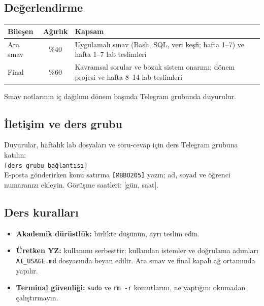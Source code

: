 \documentclass[11pt,a4paper]{article}
\begin{document}
\subsection{Değerlendirme}
\begin{center}
\begin{tabularx}{0.92\textwidth}{@{}l c Y@{}}
\toprule
\textbf{Bileşen} & \textbf{Ağırlık} & \textbf{Kapsam} \\
\midrule
Ara sınav & \%40 & Uygulamalı sınav (Bash, SQL, veri keşfi; hafta 1–7) ve hafta 1–7 lab teslimleri \\
Final & \%60 & Kavramsal sorular ve bozuk sistem onarımı; dönem projesi ve hafta 8–14 lab teslimleri \\
\bottomrule
\end{tabularx}
\end{center}
Sınav notlarının iç dağılımı dönem başında Telegram grubunda duyurulur.

\subsection{İletişim ve ders grubu}
\begin{minipage}[c]{0.62\textwidth}
Duyurular, haftalık lab dosyaları ve soru-cevap için ders Telegram grubuna katılın:\\[2mm]
\texttt{[ders grubu bağlantısı]}\\[2mm]
E-posta gönderirken konu satırına \texttt{[MBBO205]} yazın; ad, soyad ve öğrenci numaranızı ekleyin. Görüşme saatleri: [gün, saat].
\end{minipage}\hfill
\begin{minipage}[c]{0.32\textwidth}
\end{minipage}

\subsection{Ders kuralları}
\begin{itemize}
  \item \textbf{Akademik dürüstlük:} birlikte düşünün, ayrı teslim edin.
  \item \textbf{Üretken YZ:} kullanımı serbesttir; kullanılan istemler ve doğrulama adımları \texttt{AI\_USAGE.md} dosyasında beyan edilir. Ara sınav ve final kapalı ağ ortamında yapılır.
  \item \textbf{Terminal güvenliği:} \texttt{sudo} ve \texttt{rm -r} komutlarını, ne yaptığını okumadan çalıştırmayın.
\end{itemize}
\end{document}

